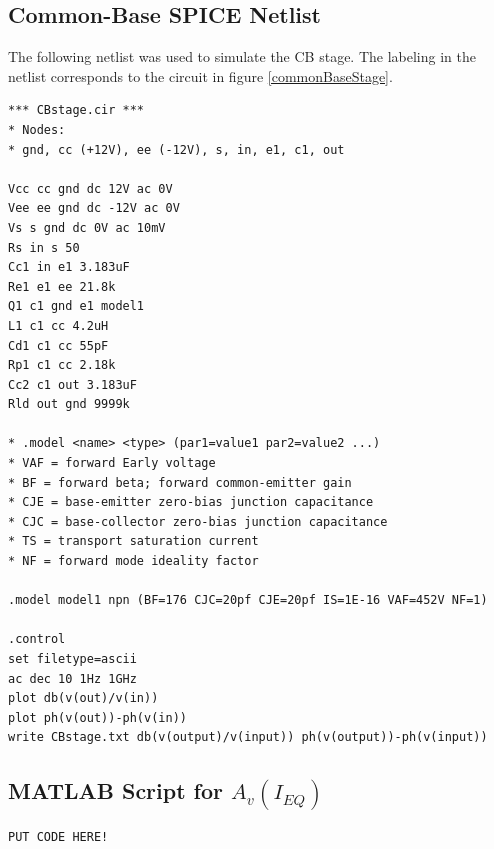 \documentclass[titlepage, letterpaper, 11pt]{article}
\begin{document}
\pagebreak
\subsection{Common-Base SPICE Netlist}
\label{CBstageNetlist}

The following netlist was used to simulate the CB stage. The labeling
in the netlist corresponds to the circuit in figure
\ref{commonBaseStage}.

\begin{verbatim}
*** CBstage.cir ***
* Nodes:
* gnd, cc (+12V), ee (-12V), s, in, e1, c1, out

Vcc cc gnd dc 12V ac 0V
Vee ee gnd dc -12V ac 0V
Vs s gnd dc 0V ac 10mV
Rs in s 50
Cc1 in e1 3.183uF
Re1 e1 ee 21.8k
Q1 c1 gnd e1 model1
L1 c1 cc 4.2uH
Cd1 c1 cc 55pF
Rp1 c1 cc 2.18k
Cc2 c1 out 3.183uF
Rld out gnd 9999k

* .model <name> <type> (par1=value1 par2=value2 ...)
* VAF = forward Early voltage
* BF = forward beta; forward common-emitter gain
* CJE = base-emitter zero-bias junction capacitance
* CJC = base-collector zero-bias junction capacitance
* TS = transport saturation current
* NF = forward mode ideality factor

.model model1 npn (BF=176 CJC=20pf CJE=20pf IS=1E-16 VAF=452V NF=1)

.control
set filetype=ascii
ac dec 10 1Hz 1GHz
plot db(v(out)/v(in))
plot ph(v(out))-ph(v(in))
write CBstage.txt db(v(output)/v(input)) ph(v(output))-ph(v(input))
\end{verbatim}

\subsection{MATLAB Script for $A_{v}(I_{EQ})$}
\label{matlabScript}

\begin{verbatim}
PUT CODE HERE!
\end{verbatim}
\end{document}

